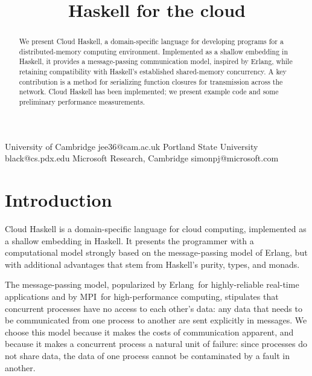 \documentclass[preprint]{sigplanconf}
\begin{document}
\title{Haskell for the cloud}
\subtitle{}

           {University of Cambridge}
           {jee36@cam.ac.uk}
           {Portland State University}
           {black@cs.pdx.edu}
           {Microsoft Research, Cambridge}
           {simonpj@microsoft.com}

\maketitle
\begin{abstract}
We present Cloud Haskell, a domain-specific language for developing programs for a distributed-memory computing environment. Implemented as a shallow embedding in Haskell, it provides a message-passing communication model, inspired by Erlang, while retaining compatibility with Haskell's established shared-memory concurrency. A key contribution is a method for serializing function closures for transmission across the network.
Cloud Haskell has been implemented; we present example code and some preliminary performance measurements.

\end{abstract}


%
%
%
%
\section{Introduction}

Cloud Haskell is a domain-specific language for cloud computing, implemented as a shallow embedding in Haskell.
It presents the programmer with a computational model strongly based on the message-passing model of  Erlang, but with additional advantages that stem from Haskell's purity, types, and monads.  

The message-passing model, popularized by \mbox{Erlang}\,\cite{Erlang93} for highly-reliable real-time applications and by MPI\,\cite{mpi99} for high-performance computing, stipulates that concurrent processes have no access to each other's data: any data that needs to be communicated from one process to another are sent explicitly in messages.  
We choose this model because it makes the costs of communication apparent, and because it makes a concurrent process a natural unit of failure: since processes do not share data, the data of one process cannot be contaminated by a fault in another.
\end{document}
